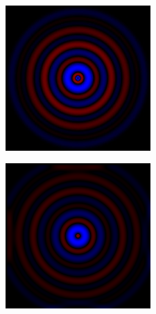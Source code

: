 \begin{figure}
\begin{subfigure}[b]{0.3\textwidth}
        \label{fig:tiger}
    \end{subfigure}
    ~ %
    \begin{subfigure}[b]{0.3\textwidth}
        \includegraphics[width=\textwidth]{include/graphics/image8}

        \label{fig:mouse}
    \end{subfigure}
    
\bigskip
        \begin{subfigure}[b]{0.3\textwidth}
        \includegraphics[width=\textwidth]{include/graphics/image9}


\end{subfigure}
\end{figure}
